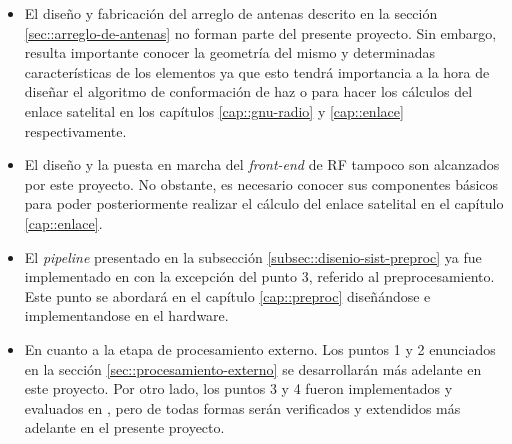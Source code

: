 \documentclass[../../main.tex]{subfiles}
\begin{document}
\begin{itemize}
    \item El diseño y fabricación del arreglo de antenas descrito en la sección \ref{sec::arreglo-de-antenas} no forman parte del presente proyecto. Sin embargo, resulta importante conocer la geometría del mismo y determinadas características de los elementos ya que esto tendrá importancia a la hora de diseñar el algoritmo de conformación de haz o para hacer los cálculos del enlace satelital en los capítulos \ref{cap::gnu-radio} y \ref{cap::enlace} respectivamente.
    
    \item El diseño y la puesta en marcha del \textit{front-end} de RF tampoco son alcanzados por este proyecto. No obstante, es necesario conocer sus componentes básicos para poder posteriormente realizar el cálculo del enlace satelital en el capítulo \ref{cap::enlace}.
    
    \item El \textit{pipeline} presentado en la subsección \ref{subsec::disenio-sist-preproc} ya fue implementado en \cite{proyecto-jose} con la excepción del punto 3, referido al preprocesamiento. Este punto se abordará en el capítulo \ref{cap::preproc} diseñándose e implementandose en el hardware.
    
    \item En cuanto a la etapa de procesamiento externo. Los puntos 1 y 2 enunciados en la sección \ref{sec::procesamiento-externo} se desarrollarán más adelante en este proyecto. Por otro lado, los puntos 3 y 4 fueron implementados y evaluados en \cite{proyecto-grigo}, pero de todas formas serán verificados y extendidos más adelante en el presente proyecto.
\end{itemize}
\end{document}
